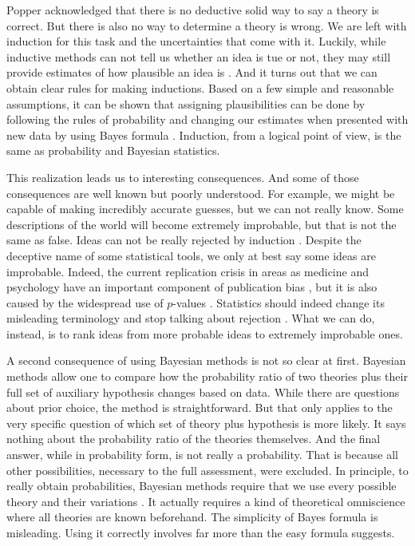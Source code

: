 \documentclass{article}
\begin{document}
	
	Popper acknowledged that there is no deductive solid way to say a theory is correct. But there is also no way to determine a theory is wrong. We are left with induction for this task and the uncertainties that come with it. Luckily, while inductive methods can not tell us whether an idea is tue or not, they may still provide estimates of how plausible an idea is \cite{cox61a}. And it turns out that we can obtain clear rules for making inductions.  Based on a few simple and reasonable assumptions, it can be shown that assigning plausibilities can be done by following the rules of probability and changing our estimates when presented with new data by using Bayes formula \cite{jaynes03}. Induction, from a logical point of view, is the same as probability and Bayesian statistics.  
	
	This realization leads us to interesting consequences. And some of those consequences are well known but poorly understood. For example, we might be capable of making incredibly accurate guesses, but we can not really know. Some descriptions of the world will become extremely improbable, but that is not the same as false. Ideas can not be really rejected by induction \cite{martins16b}. Despite the deceptive name of some statistical tools, we only at best say some ideas are improbable. Indeed, the current replication crisis in areas as medicine and psychology have an important component of publication bias \cite{ioannidis05a}, but it is also caused by the widespread use of $p$-values \cite{gigerenzermarewski15a,trafimowmarks15a}. Statistics should indeed change its misleading terminology and stop talking about rejection \cite{martins16b}. What we can do, instead, is to rank ideas from more probable ideas to extremely improbable ones. 
	
	
	A second consequence of using Bayesian methods is not so clear at first. Bayesian methods allow one to compare how the probability ratio of two theories plus their full set of auxiliary hypothesis changes based on data. While there are questions about prior choice, the method is straightforward. But that only applies to the very specific question of which set of theory plus hypothesis is more likely. It says nothing about the probability ratio of the theories themselves. And the final answer, while in probability form, is not really a probability. That is because all other possibilities, necessary to the full assessment, were excluded. In principle, to really obtain probabilities, Bayesian methods require that we use every possible theory and their variations \cite{fitelsonthomason08}. It actually requires a kind of theoretical omniscience \cite{martins05c} where all theories are known beforehand. The simplicity of Bayes formula is misleading. Using it correctly involves far more than the easy formula suggests.
	
\end{document}
